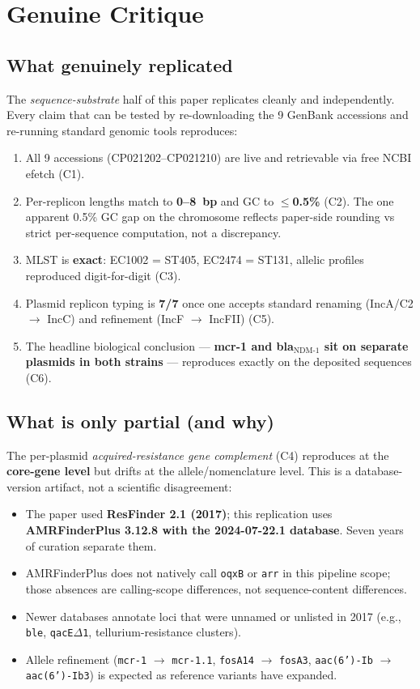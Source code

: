 \documentclass[11pt]{article}
\begin{document}
\section{Genuine Critique}

\subsection{What genuinely replicated}

The \emph{sequence-substrate} half of this paper replicates cleanly and independently. Every claim that can be tested by re-downloading the 9 GenBank accessions and re-running standard genomic tools reproduces:

\begin{enumerate}[nosep]
  \item All 9 accessions (CP021202--CP021210) are live and retrievable via free NCBI efetch (C1).
  \item Per-replicon lengths match to \textbf{0--8~bp} and GC to \textbf{$\leq$0.5\%} (C2). The one apparent 0.5\% GC gap on the chromosome reflects paper-side rounding vs strict per-sequence computation, not a discrepancy.
  \item MLST is \textbf{exact}: EC1002 = ST405, EC2474 = ST131, allelic profiles reproduced digit-for-digit (C3).
  \item Plasmid replicon typing is \textbf{7/7} once one accepts standard renaming (IncA/C2 $\to$ IncC) and refinement (IncF $\to$ IncFII) (C5).
  \item The headline biological conclusion --- \textbf{mcr-1 and bla$_{\text{NDM-1}}$ sit on separate plasmids in both strains} --- reproduces exactly on the deposited sequences (C6).
\end{enumerate}

\subsection{What is only partial (and why)}

The per-plasmid \emph{acquired-resistance gene complement} (C4) reproduces at the \textbf{core-gene level} but drifts at the allele/nomenclature level. This is a database-version artifact, not a scientific disagreement:

\begin{itemize}[nosep]
  \item The paper used \textbf{ResFinder 2.1 (2017)}; this replication uses \textbf{AMRFinderPlus 3.12.8 with the 2024-07-22.1 database}. Seven years of curation separate them.
  \item AMRFinderPlus does not natively call \texttt{oqxB} or \texttt{arr} in this pipeline scope; those absences are calling-scope differences, not sequence-content differences.
  \item Newer databases annotate loci that were unnamed or unlisted in 2017 (e.g., \texttt{ble}, \texttt{qacE$\Delta$1}, tellurium-resistance clusters).
  \item Allele refinement (\texttt{mcr-1} $\to$ \texttt{mcr-1.1}, \texttt{fosA14} $\to$ \texttt{fosA3}, \texttt{aac(6')-Ib} $\to$ \texttt{aac(6')-Ib3}) is expected as reference variants have expanded.
\end{itemize}
\end{document}
